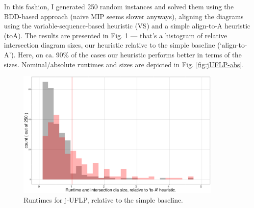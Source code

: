 \documentclass[11pt]{article}
\begin{document}
In this fashion, I generated 250 random instances and solved them using the
BDD-based approach (naive MIP seems slower anyways), aligning the diagrams using
the variable-sequence-based heuristic (VS) and a simple align-to-A heuristic
(toA). The results are presented in Fig. \ref{fig:jUFLP-hist} --- that's a
histogram of relative intersection diagram sizes, our heuristic relative to the
simple baseline (`align-to-A'). Here, on ca. 90\% of the cases our heuristic performs
better in terms of the sizes. Nominal/absolute runtimes and sizes are depicted
in Fig. \ref{fig:jUFLP-abs}.

\begin{figure}[htbp]
\centering
\includegraphics[width=0.9\textwidth]{./jUFLP_hist.png}
\caption{\label{fig:jUFLP-hist}Runtimes for j-UFLP, relative to the simple baseline.}
\end{figure}
\end{document}
